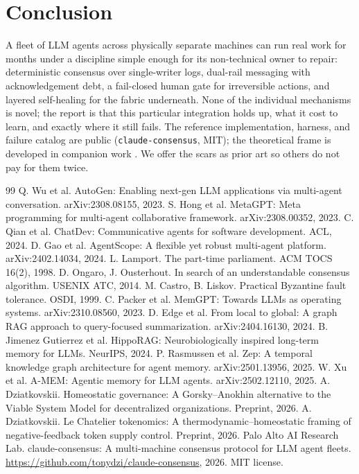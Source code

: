 \documentclass[11pt]{article}
\begin{document}
\section{Conclusion}
A fleet of LLM agents across physically separate machines can run real work for months under a discipline simple enough for its non-technical owner to repair: deterministic consensus over single-writer logs, dual-rail messaging with acknowledgement debt, a fail-closed human gate for irreversible actions, and layered self-healing for the fabric underneath. None of the individual mechanisms is novel; the report is that this particular integration holds up, what it cost to learn, and exactly where it still fails. The reference implementation, harness, and failure catalog are public (\texttt{claude-consensus}, MIT); the theoretical frame is developed in companion work \cite{homeostatic,lechatelier}. We offer the scars as prior art so others do not pay for them twice.

\begin{thebibliography}{99}
 Q. Wu et al. AutoGen: Enabling next-gen LLM applications via multi-agent conversation. arXiv:2308.08155, 2023.
 S. Hong et al. MetaGPT: Meta programming for multi-agent collaborative framework. arXiv:2308.00352, 2023.
 C. Qian et al. ChatDev: Communicative agents for software development. ACL, 2024.
 D. Gao et al. AgentScope: A flexible yet robust multi-agent platform. arXiv:2402.14034, 2024.
 L. Lamport. The part-time parliament. ACM TOCS 16(2), 1998.
 D. Ongaro, J. Ousterhout. In search of an understandable consensus algorithm. USENIX ATC, 2014.
 M. Castro, B. Liskov. Practical Byzantine fault tolerance. OSDI, 1999.
 C. Packer et al. MemGPT: Towards LLMs as operating systems. arXiv:2310.08560, 2023.
 D. Edge et al. From local to global: A graph RAG approach to query-focused summarization. arXiv:2404.16130, 2024.
 B. Jimenez Gutierrez et al. HippoRAG: Neurobiologically inspired long-term memory for LLMs. NeurIPS, 2024.
 P. Rasmussen et al. Zep: A temporal knowledge graph architecture for agent memory. arXiv:2501.13956, 2025.
 W. Xu et al. A-MEM: Agentic memory for LLM agents. arXiv:2502.12110, 2025.
 A. Dziatkovskii. Homeostatic governance: A Gorsky--Anokhin alternative to the Viable System Model for decentralized organizations. Preprint, 2026.
 A. Dziatkovskii. Le Chatelier tokenomics: A thermodynamic--homeostatic framing of negative-feedback token supply control. Preprint, 2026.
 Palo Alto AI Research Lab. claude-consensus: A multi-machine consensus protocol for LLM agent fleets. \url{https://github.com/tonydzi/claude-consensus}, 2026. MIT license.
\end{thebibliography}
\end{document}
